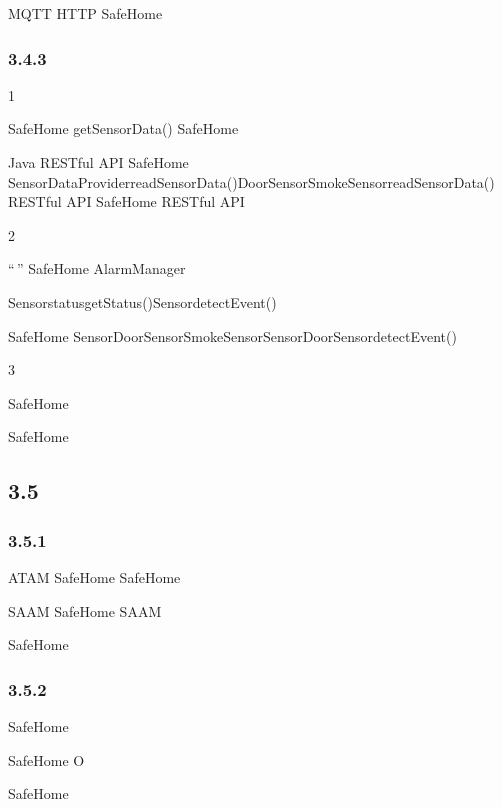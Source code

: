MQTT HTTP SafeHome

\hypertarget{section-40}{%
\subsubsection{3.4.3}\label{section-40}}

1

\important{} SafeHome getSensorData() SafeHome

\important{} Java RESTful API SafeHome
SensorDataProviderreadSensorData()DoorSensorSmokeSensorreadSensorData()
RESTful API SafeHome RESTful API

2

\important{} ``\,'' SafeHome AlarmManager

SensorstatusgetStatus()SensordetectEvent()

\important{} SafeHome
SensorDoorSensorSmokeSensorSensorDoorSensordetectEvent()

3

SafeHome

SafeHome

\hypertarget{section-41}{%
\subsection{3.5}\label{section-41}}

\hypertarget{section-42}{%
\subsubsection{3.5.1}\label{section-42}}


ATAM SafeHome SafeHome


SAAM SafeHome SAAM

\important{}

SafeHome

\hypertarget{section-43}{%
\subsubsection{3.5.2}\label{section-43}}



SafeHome


SafeHome O


SafeHome

